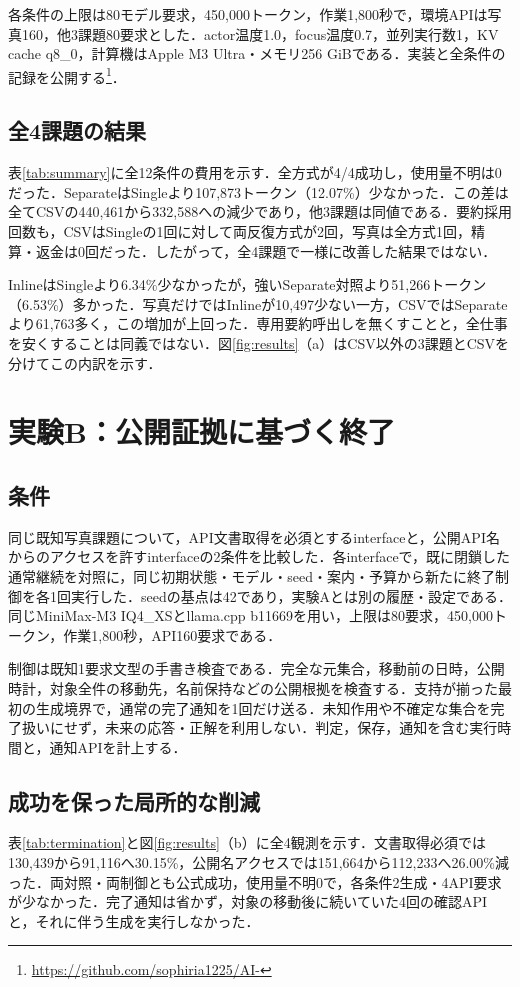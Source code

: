 \documentclass[letter]{ieicej}
\begin{document}
各条件の上限は80モデル要求，450,000トークン，作業1,800秒で，環境APIは写真160，他3課題80要求とした．actor温度1.0，focus温度0.7，並列実行数1，KV cache q8\_0，計算機はApple M3 Ultra・メモリ256 GiBである．実装と全条件の記録を公開する\footnote{\url{https://github.com/sophiria1225/AI-}}．

\subsection{全4課題の結果}
表\ref{tab:summary}に全12条件の費用を示す．全方式が4/4成功し，使用量不明は0だった．SeparateはSingleより107,873トークン（12.07\%）少なかった．この差は全てCSVの440,461から332,588への減少であり，他3課題は同値である．要約採用回数も，CSVはSingleの1回に対して両反復方式が2回，写真は全方式1回，精算・返金は0回だった．したがって，全4課題で一様に改善した結果ではない．

InlineはSingleより6.34\%少なかったが，強いSeparate対照より51,266トークン（6.53\%）多かった．写真だけではInlineが10,497少ない一方，CSVではSeparateより61,763多く，この増加が上回った．専用要約呼出しを無くすことと，全仕事を安くすることは同義ではない．図\ref{fig:results}（a）はCSV以外の3課題とCSVを分けてこの内訳を示す．



\section{実験B：公開証拠に基づく終了}
\subsection{条件}
同じ既知写真課題について，API文書取得を必須とするinterfaceと，公開API名からのアクセスを許すinterfaceの2条件を比較した．各interfaceで，既に閉鎖した通常継続を対照に，同じ初期状態・モデル・seed・案内・予算から新たに終了制御を各1回実行した．seedの基点は42であり，実験Aとは別の履歴・設定である．同じMiniMax-M3 IQ4\_XSとllama.cpp b11669を用い，上限は80要求，450,000トークン，作業1,800秒，API160要求である．

制御は既知1要求文型の手書き検査である．完全な元集合，移動前の日時，公開時計，対象全件の移動先，名前保持などの公開根拠を検査する．支持が揃った最初の生成境界で，通常の完了通知を1回だけ送る．未知作用や不確定な集合を完了扱いにせず，未来の応答・正解を利用しない．判定，保存，通知を含む実行時間と，通知APIを計上する．

\subsection{成功を保った局所的な削減}
表\ref{tab:termination}と図\ref{fig:results}（b）に全4観測を示す．文書取得必須では130,439から91,116へ30.15\%，公開名アクセスでは151,664から112,233へ26.00\%減った．両対照・両制御とも公式成功，使用量不明0で，各条件2生成・4API要求が少なかった．完了通知は省かず，対象の移動後に続いていた4回の確認APIと，それに伴う生成を実行しなかった．
\end{document}
